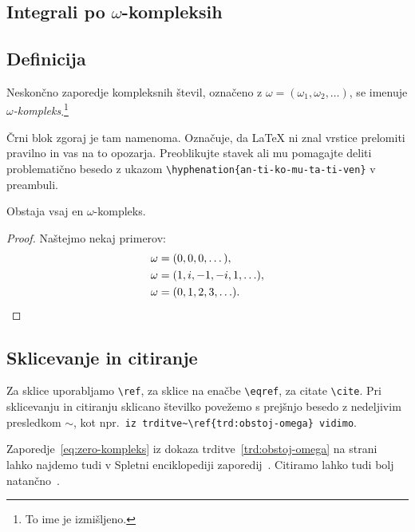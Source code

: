 \documentclass[mat2, anglescina, tisk]{fmfdelo}
\begin{document}
\begin{razsirjenipovzetek}

\subsection{Integrali po \texorpdfstring{$\omega$}{ω}-kompleksih}
\subsection{Definicija}
\begin{definicija}
  Neskončno zaporedje kompleksnih števil, označeno z $\omega = (\omega_1, \omega_2, \ldots)$,
  se imenuje \emph{$\omega$-kompleks}.\footnote{To ime je izmišljeno.}

  Črni blok zgoraj je tam namenoma. Označuje, da \LaTeX{} ni znal vrstice prelomiti pravilno
  in vas na to opozarja. Preoblikujte stavek ali mu pomagajte deliti problematično besedo z
  ukazom \verb|\hyphenation{an-ti-ko-mu-ta-ti-ven}| v preambuli.
\end{definicija}
\begin{trditev}
  \label{trd:obstoj-omega}
  Obstaja vsaj en $\omega$-kompleks.
\end{trditev}
\begin{proof}
  Naštejmo nekaj primerov:
  \begin{align}
    \omega &= (0, 0, 0, \dots), \label{eq:zero-kompleks} \\
    \omega &= (1, i, -1, -i, 1, \ldots),  \\
    \omega &= (0, 1, 2, 3, \ldots). \qedhere  %
  \end{align}
\end{proof}
\subsection{Sklicevanje in citiranje}
Za sklice uporabljamo \verb|\ref|, za sklice na enačbe \verb|\eqref|, za citate \verb|\cite|. Pri
sklicevanju in citiranju sklicano številko povežemo s prejšnjo besedo z nedeljivim presledkom
$\sim$, kot npr.\ \verb|iz trditve~\ref{trd:obstoj-omega} vidimo|.

\begin{primer}
  Zaporedje~\eqref{eq:zero-kompleks} iz dokaza trditve~\ref{trd:obstoj-omega} na
  strani~\pageref{trd:obstoj-omega} lahko najdemo tudi v Spletni enciklopediji zaporedij~\cite{oeis}.
  Citiramo lahko tudi bolj natančno~\cite[trditev 2.1, str.\ 23]{lebedev2009introduction}.
\end{primer}


\end{razsirjenipovzetek}
\end{document}
